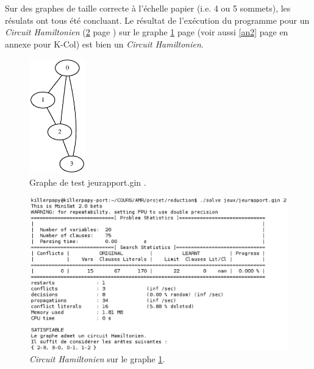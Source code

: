   \indent Sur des graphes de taille correcte à l'échelle papier (i.e. 4
  ou 5 sommets), les résulats ont tous été concluant. Le résultat de
  l'exécution du programme pour un \emph{Circuit Hamiltonien} (\ref{ham}
  page \pageref{ham}) sur le graphe \ref{graphe1} page \pageref{graphe1} 
  (voir aussi \ref{an2} page \pageref{an2} en annexe pour K-Col)
  est bien un \emph{Circuit Hamiltonien}.

  \begin{figure}[!ht]
   \begin{center}
    \includegraphics[height=5cm]{images/jeurap.ps}
    \caption{Graphe de test jeurapport.gin .\label{graphe1}}
   \end{center}
  \end{figure}

  \begin{figure}[!ht]
   \begin{center}
    \includegraphics[width=12cm]{images/chemin.eps}
    \caption{\emph{Circuit Hamiltonien} sur le graphe
    \ref{graphe1}.\label{ham}}
   \end{center}
  \end{figure}